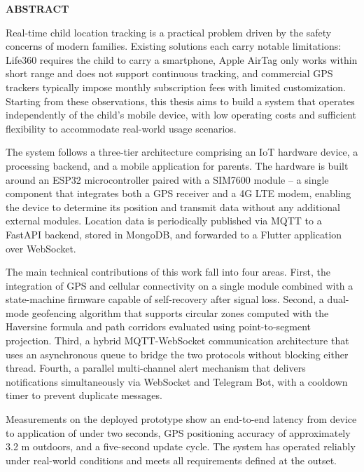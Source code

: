 \documentclass[../DoAn.tex]{subfiles}
\begin{document}
\begin{center}
    \Large{\textbf{ABSTRACT}}\\
\end{center}
\vspace{1cm}

Real-time child location tracking is a practical problem driven by the safety concerns of modern families. Existing solutions each carry notable limitations: Life360 requires the child to carry a smartphone, Apple AirTag only works within short range and does not support continuous tracking, and commercial GPS trackers typically impose monthly subscription fees with limited customization. Starting from these observations, this thesis aims to build a system that operates independently of the child's mobile device, with low operating costs and sufficient flexibility to accommodate real-world usage scenarios.

The system follows a three-tier architecture comprising an IoT hardware device, a processing backend, and a mobile application for parents. The hardware is built around an ESP32 microcontroller paired with a SIM7600 module -- a single component that integrates both a GPS receiver and a 4G LTE modem, enabling the device to determine its position and transmit data without any additional external modules. Location data is periodically published via MQTT to a FastAPI backend, stored in MongoDB, and forwarded to a Flutter application over WebSocket.

The main technical contributions of this work fall into four areas. First, the integration of GPS and cellular connectivity on a single module combined with a state-machine firmware capable of self-recovery after signal loss. Second, a dual-mode geofencing algorithm that supports circular zones computed with the Haversine formula and path corridors evaluated using point-to-segment projection. Third, a hybrid MQTT-WebSocket communication architecture that uses an asynchronous queue to bridge the two protocols without blocking either thread. Fourth, a parallel multi-channel alert mechanism that delivers notifications simultaneously via WebSocket and Telegram Bot, with a cooldown timer to prevent duplicate messages.

Measurements on the deployed prototype show an end-to-end latency from device to application of under two seconds, GPS positioning accuracy of approximately 3.2 m outdoors, and a five-second update cycle. The system has operated reliably under real-world conditions and meets all requirements defined at the outset.
\end{document}
